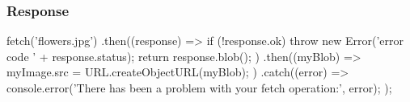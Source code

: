 \begin{frame}[fragile]
\frametitle{Response}
\begin{CodeBox}{}
fetch('flowers.jpg')
  .then((response) => {
    if (!response.ok) {
      throw new Error('error code ' + response.status);
    }
    return response.blob();
  })
  .then((myBlob) => {
    myImage.src = URL.createObjectURL(myBlob);
  })
  .catch((error) => {
    console.error('There has been a problem with your fetch operation:', error);
  });
  \end{CodeBox}
\end{frame}
